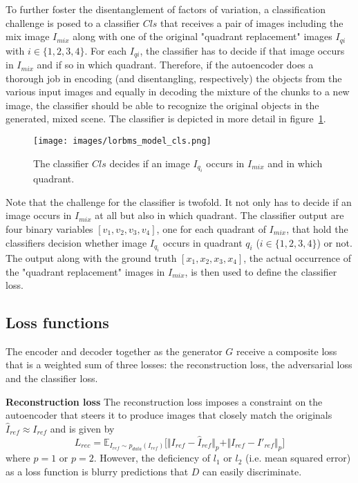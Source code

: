 \documentclass[12pt,a4paper]{article}
\begin{document}
To further foster the disentanglement of factors of variation, a classification challenge is posed to a classifier $Cls$ that receives a pair of images including the mix image $I_{mix}$ along with one of the original "quadrant replacement" images $I_{qi}$ with $i \in \{1,2,3,4\}$. For each $I_{qi}$, the classifier has to decide if that image occurs in $I_{mix}$ and if so in which quadrant. Therefore, if the autoencoder does a thorough job in encoding (and disentangling, respectively) the objects from the various input images and equally in decoding the mixture of the chunks to a new image, the classifier should be able to recognize the original objects in the generated, mixed scene. The classifier is depicted in more detail in figure~\ref{fig:model_cls}.
\begin{figure}[ht]
\centering
\texttt{[image: images/lorbms\_model\_cls.png]}
\caption{The classifier $Cls$ decides if an image $I_{q_i}$ occurs in $I_{mix}$ and in which quadrant.}
\label{fig:model_cls}
\end{figure}
Note that the challenge for the classifier is twofold. It not only has to decide if an image occurs in $I_{mix}$ at all but also in which quadrant. The classifier output are four binary variables $[v_1,v_2,v_3,v_4]$, one for each quadrant of $I_{mix}$, that hold the classifiers decision whether image $I_{q_i}$ occurs in quadrant $q_i$ ($i \in \{1,2,3,4\}$) or not. The output along with the ground truth $[x_1,x_2,x_3,x_4]$, the actual occurrence of the "quadrant replacement" images in $I_{mix}$, is then used to define the classifier loss.


\subsection{Loss functions}
The encoder and decoder together as the generator $G$ receive a composite loss that is a weighted sum of three losses: the reconstruction loss, the adversarial loss and the classifier loss. 

\textbf{Reconstruction loss} The reconstruction loss imposes a constraint on the autoencoder that steers it to produce images that closely match the originals $\hat{I}_{ref} \approx I_{ref}$ and is given by
\begin{equation} \label{eq:4}
    L_{rec} = \mathbb{E}_{I_{ref}\sim p_{data} (I_{ref})}\big[ \Vert I_{ref} - \hat{I}_{ref} \Vert_p + \Vert I_{ref} - I'_{ref} \Vert_p \big]
\end{equation}
where $p = 1$ or $p = 2$. However, the deficiency of $l_1$ or $l_2$ (i.e. mean squared error) as a loss function is blurry predictions that $D$ can easily discriminate. 
\end{document}
